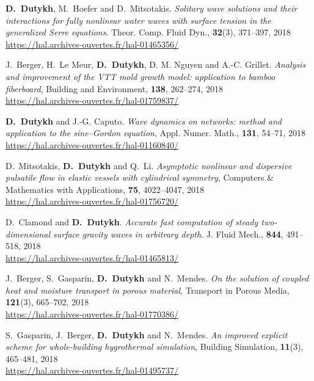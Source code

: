 \begin{etaremune}
  \item \textbf{D.~Dutykh}, M.~Hoefer and D.~Mitsotakis. \textit{Solitary wave solutions and their interactions for fully nonlinear water waves with surface tension in the generalized Serre equations}. Theor. Comp. Fluid Dyn., \textbf{32}(3), 371--397, 2018 \\ %
  \url{https://hal.archives-ouvertes.fr/hal-01465356/}

  \item J.~Berger, H.~Le Meur, \textbf{D.~Dutykh}, D. M. Nguyen and A.-C. Grillet. \textit{Analysis and improvement of the VTT mold growth model: application to bamboo fiberboard}, Building and Environment, \textbf{138}, 262--274, 2018 \\ %
  \url{https://hal.archives-ouvertes.fr/hal-01759837/}

  \item \textbf{D.~Dutykh} and J.-G. Caputo. \textit{Wave dynamics on networks: method and application to the sine--Gordon equation}, Appl. Numer. Math., \textbf{131}, 54--71, 2018 \\ %
  \url{https://hal.archives-ouvertes.fr/hal-01160840/}
  
  \item D.~Mitsotakis, \textbf{D.~Dutykh} and Q.~Li. \textit{Asymptotic nonlinear and dispersive pulsatile flow in elastic vessels with cylindrical symmetry}, Computers \& Mathematics with Applications, \textbf{75}, 4022--4047, 2018 \\ %
  \url{https://hal.archives-ouvertes.fr/hal-01756720/}

  \item D.~Clamond and \textbf{D.~Dutykh}. \textit{Accurate fast computation of steady two-dimensional surface gravity waves in arbitrary depth}. J. Fluid Mech., \textbf{844}, 491--518, 2018 \\ %
  \url{https://hal.archives-ouvertes.fr/hal-01465813/}

  \item J.~Berger, S.~Gasparin, \textbf{D.~Dutykh} and N.~Mendes. \textit{On the solution of coupled heat and moisture transport in porous material}, Transport in Porous Media, \textbf{121}(3), 665--702, 2018 \\ %
  \url{https://hal.archives-ouvertes.fr/hal-01770386/}

  \item S.~Gasparin, J.~Berger, \textbf{D.~Dutykh} and N.~Mendes. \textit{An improved explicit scheme for whole-building hygrothermal simulation}, Building Simulation, \textbf{11}(3), 465--481, 2018 \\ %
  \url{https://hal.archives-ouvertes.fr/hal-01495737/}
  

\end{etaremune}
